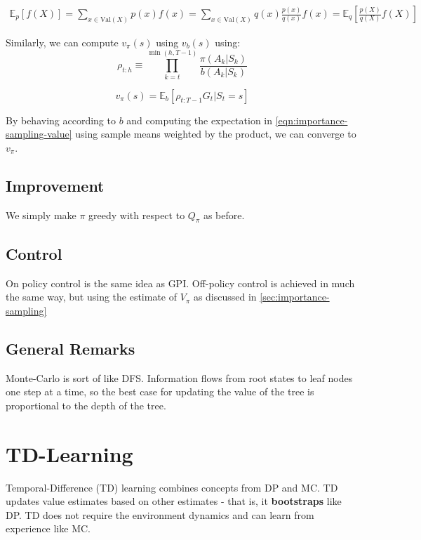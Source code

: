 \documentclass[11pt]{report}
\begin{document}
\begin{align}
	\mathbb{E}_p[f(X)] = \sum_{x \in \text{Val}(X)} p(x)f(x) = \sum_{x \in \text{Val}(X)} q(x) \frac{p(x)}{q(x)}f(x) = \mathbb{E}_q\left[\frac{p(X)}{q(X)}f(X)\right]
\end{align}

Similarly, we can compute $v_\pi(s)$ using $v_b(s)$ using:
\begin{equation}
	\label{eqn:importance-sampling-ratio}
	\rho_{t:h} \equiv \prod_{k=t}^{\min(h,T-1)}	\frac{\pi(A_k|S_k)}{b(A_k|S_k)}
\end{equation}

\begin{equation}
	\label{eqn:importance-sampling-value}
	v_\pi(s) = \mathbb{E}_b\left[\rho_{t:T-1}G_t | S_t = s\right]
\end{equation}

By behaving according to $b$ and computing the expectation in \autoref{eqn:importance-sampling-value} using sample means weighted by the product, we can converge to $v_\pi$.



\section{Improvement}
We simply make $\pi$ greedy with respect to $Q_\pi$ as before.

\section{Control}
On policy control is the same idea as GPI. Off-policy control is achieved in much the same way, but using the estimate of $V_\pi$ as discussed in \autoref{sec:importance-sampling}


\section{General Remarks}
Monte-Carlo is sort of like DFS. Information flows from root states to leaf nodes one step at a time, so the best case for updating the value of the tree is proportional to the depth of the tree.

\chapter{TD-Learning}\label{sec:TD-Learning}

Temporal-Difference (TD) learning combines concepts from DP and MC. TD updates value estimates based on other estimates - that is, it \textbf{bootstraps} like DP. TD does not require the environment dynamics and can learn from experience like MC.
\end{document}
